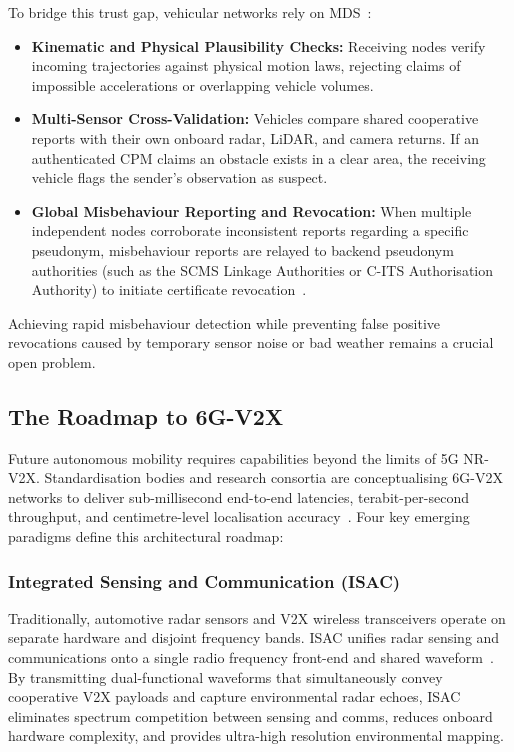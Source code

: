 To bridge this trust gap, vehicular networks rely on MDS~\cite{haidar2019risk}:
\begin{itemize}
    \item \textbf{Kinematic and Physical Plausibility Checks:} Receiving nodes verify incoming trajectories against physical motion laws, rejecting claims of impossible accelerations or overlapping vehicle volumes.
    \item \textbf{Multi-Sensor Cross-Validation:} Vehicles compare shared cooperative reports with their own onboard radar, LiDAR, and camera returns.
    If an authenticated CPM claims an obstacle exists in a clear area, the receiving vehicle flags the sender's observation as suspect.
    \item \textbf{Global Misbehaviour Reporting and Revocation:} When multiple independent nodes corroborate inconsistent reports regarding a specific pseudonym, misbehaviour reports are relayed to backend pseudonym authorities (such as the SCMS Linkage Authorities or C-ITS Authorisation Authority) to initiate certificate revocation~\cite{simplicio2018privacy}.
\end{itemize}
Achieving rapid misbehaviour detection while preventing false positive revocations caused by temporary sensor noise or bad weather remains a crucial open problem.

\subsection{The Roadmap to 6G-V2X}
\label{subsec:roadmap_6g}

Future autonomous mobility requires capabilities beyond the limits of 5G NR-V2X.
Standardisation bodies and research consortia are conceptualising 6G-V2X networks to deliver sub-millisecond end-to-end latencies, terabit-per-second throughput, and centimetre-level localisation accuracy~\cite{zhang2026cooperative}.
Four key emerging paradigms define this architectural roadmap:

\subsubsection{Integrated Sensing and Communication (ISAC)}
Traditionally, automotive radar sensors and V2X wireless transceivers operate on separate hardware and disjoint frequency bands.
ISAC unifies radar sensing and communications onto a single radio frequency front-end and shared waveform~\cite{zhang2026cooperative}.
By transmitting dual-functional waveforms that simultaneously convey cooperative V2X payloads and capture environmental radar echoes, ISAC eliminates spectrum competition between sensing and comms, reduces onboard hardware complexity, and provides ultra-high resolution environmental mapping.

